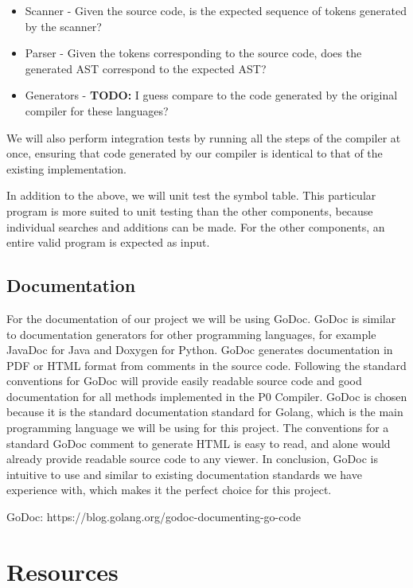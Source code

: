 \documentclass{article}
\begin{document}
\begin{itemize}
  \item Scanner - Given the source code, is the expected sequence of tokens
    generated by the scanner?
  \item Parser - Given the tokens corresponding to the source code, does the
    generated AST correspond to the expected AST?
  \item Generators - \textbf{TODO:} I guess compare to the code generated by the
    original compiler for these languages?
\end{itemize}

We will also perform integration tests by running all the steps of the compiler
at once, ensuring that code generated by our compiler is identical to that of
the existing implementation.

In addition to the above, we will unit test the symbol table.
This particular program is more suited to unit testing than the other components,
because individual searches and additions can be made.
For the other components, an entire valid program is expected as input.

\subsection{Documentation} %

For the documentation of our project we will be using GoDoc. GoDoc is similar to documentation 
generators for other programming languages, for example JavaDoc for Java and Doxygen for Python. 
GoDoc generates documentation in PDF or HTML format from comments in the source code. 
Following the standard conventions for GoDoc will provide easily readable source code and good 
documentation for all methods implemented in the P0 Compiler. GoDoc is chosen because it is the standard documentation standard for Golang, 
which is the main programming language we will be using for this project. The conventions for a standard GoDoc comment to generate HTML
 is easy to read, and alone would already provide readable source code to any viewer. 
 In conclusion, GoDoc is intuitive to use and similar to existing documentation standards we have experience with, 
 which makes it the perfect choice for this project.
 
GoDoc: https://blog.golang.org/godoc-documenting-go-code

\section{Resources}
\end{document}
